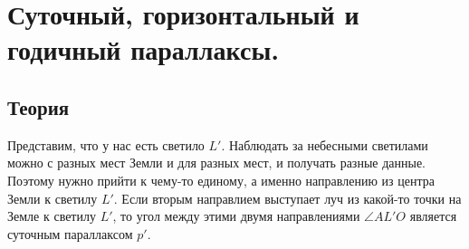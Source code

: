 \documentclass[16pt,a4paper]{report}
\begin{document}
\section{Суточный, горизонтальный и годичный параллаксы.}
\subsection{Теория}

Представим, что у нас есть светило $L'$. Наблюдать за небесными светилами можно с разных мест Земли и для разных мест, и получать разные данные. Поэтому нужно прийти к чему-то единому, а именно направлению из центра Земли к светилу $L'$. Если вторым направлием выступает луч из какой-то точки на Земле к светилу $L'$, то угол между этими двумя направлениями $\angle{AL'O}$ является суточным параллаксом $p'$. 
\end{document}
